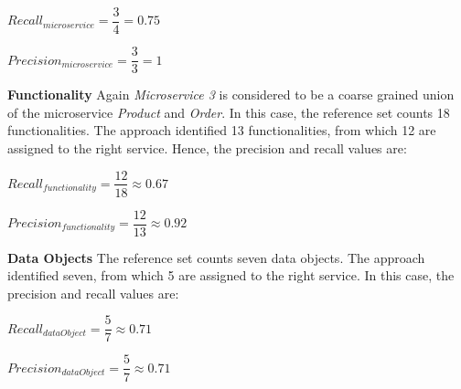 \hspace{1cm}
\noindent
\begin{minipage}{.4\linewidth}
	\vspace{0.5cm}
	\flushleft
	
	
	$Recall_{microservice}=\dfrac{3}{4} = 0.75  $
	\vspace{0.5cm}
	
\end{minipage}%
\begin{minipage}{.5\linewidth}
	\vspace{0.5cm}
	\flushleft
	
	
	$Precision_{microservice}=\dfrac{3}{3} = 1  $
	\vspace{0.5cm}
	
\end{minipage}

\noindent
\textbf{Functionality} Again \textit{Microservice 3} is considered to be a coarse grained union of the microservice \textit{Product} and \textit{Order}. In this case, the reference set counts 18 functionalities. The approach identified 13 functionalities, from which 12 are assigned to the right service. Hence, the precision and recall values are:

\hspace{1cm}
\noindent
\begin{minipage}{.4\linewidth}
	\vspace{0.5cm}
	\flushleft
	
	
	$Recall_{functionality}=\dfrac{12}{18} \approx 0.67  $
	\vspace{0.5cm}
	
\end{minipage}%
\begin{minipage}{.5\linewidth}
	\vspace{0.5cm}
	\flushleft
	
	
	$Precision_{functionality}=\dfrac{12}{13} \approx 0.92  $
	\vspace{0.5cm}
	
\end{minipage}


\noindent
\textbf{Data Objects} The reference set counts seven data objects. The approach identified seven, from which 5 are assigned to the right service. In this case, the precision and recall values are:


\hspace{1cm}
\noindent
\begin{minipage}{.4\linewidth}
	\vspace{0.5cm}
	\flushleft
	
	
	$Recall_{dataObject}=\dfrac{5}{7} \approx 0.71  $
	\vspace{0.5cm}
	
\end{minipage}%
\begin{minipage}{.5\linewidth}
	\vspace{0.5cm}
	\flushleft
	
	
	$Precision_{dataObject}=\dfrac{5}{7} \approx 0.71  $
	\vspace{0.5cm}
	
\end{minipage}

